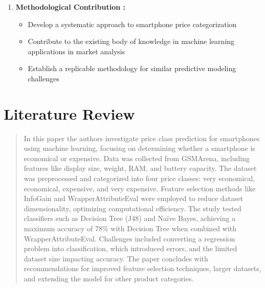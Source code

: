 \documentclass[12pt]{report}
\begin{document}
\begin{enumerate}
\begin{itemize}
		\end{itemize}
	\item{\textbf{Methodological Contribution :}}
		\vspace{-1.65em}
		\begin{itemize}
			\setlength\itemsep{-1.5em}
			\item Develop a systematic approach to smartphone price categorization
			\item Contribute to the existing body of knowledge in machine learning applications in market analysis
			\item Establish a replicable methodology for similar predictive modeling challenges
		\end{itemize}
\end{enumerate}

\chapter{Literature Review}
\begin{quotation}
  In this paper \cite{asim2018} the authors investigate price class prediction for smartphones using machine learning, focusing on determining whether a smartphone is economical or expensive. Data was collected from GSMArena, including features like display size, weight, RAM, and battery capacity. The dataset was preprocessed and categorized into four price classes: very economical, economical, expensive, and very expensive. Feature selection methods like InfoGain and WrapperAttributeEval were employed to reduce dataset dimensionality, optimizing computational efficiency. The study tested classifiers such as Decision Tree (J48) and Naïve Bayes, achieving a maximum accuracy of 78\% with Decision Tree when combined with WrapperAttributeEval. Challenges included converting a regression problem into classification, which introduced errors, and the limited dataset size impacting accuracy. The paper concludes with recommendations for improved feature selection techniques, larger datasets, and extending the model for other product categories.
\end{quotation}
\end{document}
